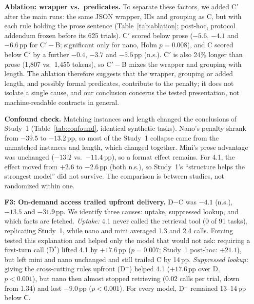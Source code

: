 \documentclass[conference]{IEEEtran}
\newcommand{\pp}{\,pp}
\begin{document}
\textbf{Ablation: wrapper vs.\ predicates.} To separate these factors, we added C$'$ after the main runs: the same JSON wrapper, IDs and grouping as C, but with each rule holding the prose sentence (Table~\ref{tab:ablation}; post-hoc, protocol addendum frozen before its 625 trials). C$'$ scored below prose ($-5.6$, $-4.1$ and $-6.6$\pp{} for C$'-$B; significant only for nano, Holm $p=0.008$), and C scored below C$'$ by a further $-0.4$, $-3.7$ and $-5.5$\pp{} (n.s.). C$'$ is also 24\% longer than prose (1{,}807 vs.\ 1{,}455 tokens), so C$'-$B mixes the wrapper and grouping with length. The ablation therefore suggests that the wrapper, grouping or added length, and possibly formal predicates, contribute to the penalty; it does not isolate a single cause, and our conclusion concerns the tested presentation, not machine-readable contracts in general.

\begin{table}[t]
\caption{Ablation (post-hoc): first-attempt correctness (\%) for prose (B), JSON with prose sentences (C$'$) and JSON with formal predicates (C); paired contrasts in pp, 95\% cluster CI, (Holm $p$ over the two contrasts). 4.1: its 91 tasks.}
\label{tab:ablation}
\centering\scriptsize
\setlength{\tabcolsep}{2pt}

\end{table}

\textbf{Confound check.} Matching instances and length changed the conclusions of Study~1 (Table~\ref{tab:confound}, identical synthetic tasks). Nano's penalty shrank from $-39.5$ to $-13.2$\pp, so most of the Study~1 collapse came from the unmatched instances and length, which changed together. Mini's prose advantage was unchanged ($-13.2$ vs.\ $-11.4$\pp), so a format effect remains. For 4.1, the effect moved from $+2.6$ to $-2.6$\pp{} (both n.s.), so Study~1's ``structure helps the strongest model'' did not survive. The comparison is between studies, not randomized within one.

\textbf{F3: On-demand access trailed upfront delivery.} D$-$C was $-4.1$ (n.s.), $-13.5$ and $-31.9$\pp. We identify three causes: uptake, suppressed lookup, and which facts are fetched. \emph{Uptake:} 4.1 never called the retrieval tool (0 of 91 tasks), replicating Study~1, while nano and mini averaged 1.3 and 2.4 calls. Forcing tested this explanation and helped only the model that would not ask: requiring a first-turn call (D$^\ast$) lifted 4.1 by $+17.6$\pp{} ($p=0.007$; Study~1 post-hoc: $+21.1$), but left mini and nano unchanged and still trailed C by 14\pp. \emph{Suppressed lookup:} giving the cross-cutting rules upfront (D$^+$) helped 4.1 ($+17.6$\pp{} over D, $p<0.001$), but nano then almost stopped retrieving (0.02 calls per trial, down from 1.34) and lost $-9.0$\pp{} ($p<0.001$). For every model, D$^+$ remained 13--14\pp{} below C.
\end{document}
